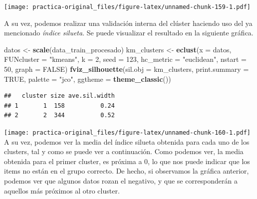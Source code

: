 \documentclass[spanish,]{article}
\newenvironment{Shaded}{\begin{snugshade}}{\end{snugshade}}
\newcommand{\KeywordTok}[1]{\textcolor[rgb]{0.13,0.29,0.53}{\textbf{#1}}}
\newcommand{\DataTypeTok}[1]{\textcolor[rgb]{0.13,0.29,0.53}{#1}}
\newcommand{\DecValTok}[1]{\textcolor[rgb]{0.00,0.00,0.81}{#1}}
\newcommand{\StringTok}[1]{\textcolor[rgb]{0.31,0.60,0.02}{#1}}
\newcommand{\CommentTok}[1]{\textcolor[rgb]{0.56,0.35,0.01}{\textit{#1}}}
\newcommand{\OtherTok}[1]{\textcolor[rgb]{0.56,0.35,0.01}{#1}}
\newcommand{\OperatorTok}[1]{\textcolor[rgb]{0.81,0.36,0.00}{\textbf{#1}}}
\newcommand{\NormalTok}[1]{#1}
\begin{document}
\texttt{[image: practica-original\_files/figure-latex/unnamed-chunk-159-1.pdf]}

A su vez, podemos realizar una validación interna del clúster haciendo
uso del ya mencionado \emph{índice silueta}. Se puede visualizar el
resultado en la siguiente gráfica.

\begin{Shaded}
\begin{Highlighting}[]
\NormalTok{datos <-}\StringTok{ }\KeywordTok{scale}\NormalTok{(data_train_procesado)}
\NormalTok{km_clusters <-}\StringTok{ }\KeywordTok{eclust}\NormalTok{(}\DataTypeTok{x =}\NormalTok{ datos, }\DataTypeTok{FUNcluster =} \StringTok{"kmeans"}\NormalTok{, }\DataTypeTok{k =} \DecValTok{2}\NormalTok{, }\DataTypeTok{seed =} \DecValTok{123}\NormalTok{,}
                      \DataTypeTok{hc_metric =} \StringTok{"euclidean"}\NormalTok{, }\DataTypeTok{nstart =} \DecValTok{50}\NormalTok{, }\DataTypeTok{graph =} \OtherTok{FALSE}\NormalTok{)}
\KeywordTok{fviz_silhouette}\NormalTok{(}\DataTypeTok{sil.obj =}\NormalTok{ km_clusters, }\DataTypeTok{print.summary =} \OtherTok{TRUE}\NormalTok{, }\DataTypeTok{palette =} \StringTok{"jco"}\NormalTok{,}
                \DataTypeTok{ggtheme =} \KeywordTok{theme_classic}\NormalTok{()) }
\end{Highlighting}
\end{Shaded}

\begin{verbatim}
##   cluster size ave.sil.width
## 1       1  158          0.24
## 2       2  344          0.52
\end{verbatim}

\texttt{[image: practica-original\_files/figure-latex/unnamed-chunk-160-1.pdf]}
A su vez, podemos ver la media del índice silueta obtenida para cada uno
de los clusters, tal y como se puede ver a continuación. Como podemos
ver, la media obtenida para el primer cluster, es próxima a 0, lo que
nos puede indicar que los items no están en el grupo correcto. De hecho,
si observamos la gráfica anterior, podemos ver que algunos datos rozan
el negativo, y que se corresponderán a aquellos más próximos al otro
cluster.

\begin{Shaded}
\end{Shaded}
\end{document}
